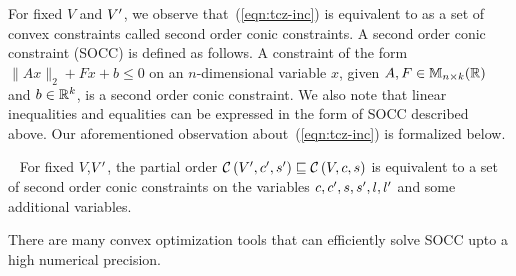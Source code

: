 For fixed $V$ and $V^\prime$, we observe that~(\ref{eqn:tcz-inc}) is
equivalent to as a set of convex constraints called second order
conic constraints.  A second order conic constraint (SOCC)
is defined as follows.
%
A constraint of the form $\|Ax\|_{2}+Fx+b\leq 0$ on an $n$-dimensional
variable $x$, given $A,F\in\mathbb{M}_{n\times k}(\mathbb{\mathbb{R}})$ and $b\in\mathbb{R}^k$, is
a second order conic constraint.
%
We also note that linear inequalities and equalities can be expressed
in the form of SOCC described above.  Our aforementioned observation
about~(\ref{eqn:tcz-inc}) is formalized below.
%
\begin{proposition}~\label{lem:zon-socc}
For fixed $V$,$V^\prime$, the partial order
$\mathcal{C}\left(V^\prime,c^\prime,s^\prime\right)\sqsubseteq \mathcal{C}\left(V,c,s\right)$ is equivalent to a set
of second order conic constraints on the variables
$c,c^\prime,s,s^\prime,l,l^\prime$ and some additional variables.
\end{proposition}
%
There are many convex optimization tools that can efficiently solve
SOCC upto a high numerical precision.  
